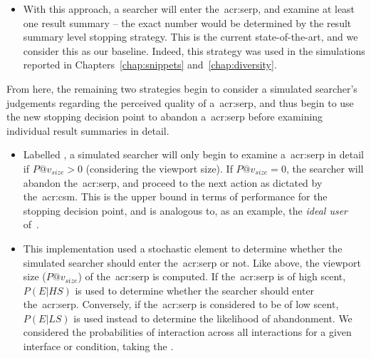 \begin{itemize}
    \item{ With this approach, a searcher will  enter the~\gls{acr:serp}, and examine at least one result summary -- the exact number would be determined by the result summary level stopping strategy. This is the current state-of-the-art, and we consider this as our baseline. Indeed, this strategy was used in the simulations reported in Chapters~\ref{chap:snippets} and~\ref{chap:diversity}.}
\end{itemize}

From here, the remaining two strategies begin to consider a simulated searcher's judgements regarding the perceived quality of a~\gls{acr:serp}, and thus begin to use the new stopping decision point to abandon a~\gls{acr:serp} before examining individual result summaries in detail.

\begin{itemize}
    \item{ Labelled , a simulated searcher will only begin to examine a~\gls{acr:serp} in detail if $P@v_{size} > 0$ (considering the viewport size). If $P@v_{size} = 0$, the searcher will abandon the~\gls{acr:serp}, and proceed to the next action as dictated by the~\gls{acr:csm}. This is the upper bound in terms of performance for the stopping decision point, and is analogous to, as an example, the \emph{ideal user} of~\cite{hagen2016simulating_users}.}
    
    \item{ This implementation used a stochastic element to determine whether the simulated searcher should enter the~\gls{acr:serp} or not. Like above, the viewport size ($P@v_{size}$) of the~\gls{acr:serp} is computed. If the~\gls{acr:serp} is of high scent, $P(E|HS)$ is used to determine whether the searcher should enter the~\gls{acr:serp}. Conversely, if the~\gls{acr:serp} is considered to be of low scent, $P(E|LS)$ is used instead to determine the likelihood of abandonment. We considered the probabilities of interaction across all interactions for a given interface or condition, taking the .}
    
%
\end{itemize}

